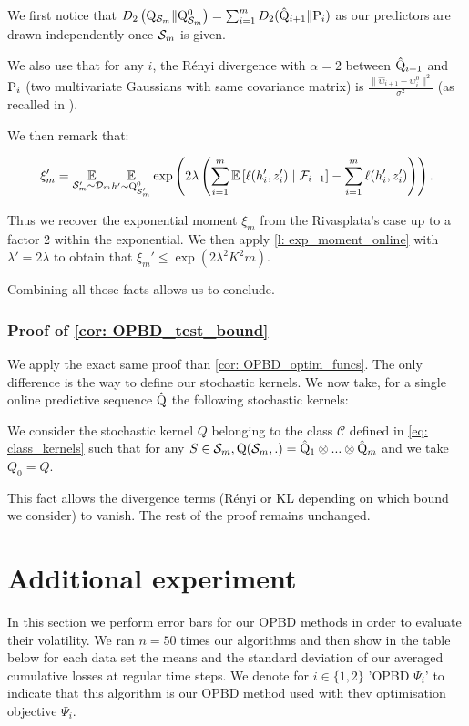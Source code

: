 We first notice that $D_{2}\left(\Q_{\Sm} \| \Q_{\Sm}^0\right) = \sum_{i=1}^m D_2(\hat{\Q}_{i+1}\| \P_{i})$ as our predictors are drawn independently once $\Sm$ is given.

We also use that for any $i$, the Rényi divergence with $\alpha=2$ between $\hat{\Q}_{i+1}$ and $\P_{i}$ (two multivariate Gaussians with same covariance matrix) is $\frac{\|\hat{w}_{i+1}- w_i^0\|^2}{\sigma^2}$ (as recalled in \cite{gil2013renyi}).

We then remark that:

\[ \xi'_m = \underset{\Sm^{\prime} \sim \Dm}{\mathbb{E}} \underset{h^{\prime} \sim \Q_{\Sm'}^0}{\mathbb{E}}
\exp\left(2\lambda \left(\sum_{i=1}^m \mathbb{E}\left[\ell(h_i',z_i')\mid \mathcal{F}_{i-1}\right]- \sum_{i=1}^m \ell(h_i',z_i') \right)\right).  \]

Thus we recover the exponential moment $\xi_m$ from the Rivasplata's case up to a factor 2 within the exponential. We then apply \cref{l: exp_moment_online} with $\lambda'= 2\lambda$ to obtain that $\xi_m'\leq \exp\left(  2\lambda^2K^2m \right)$.


Combining all those facts allows us to conclude.




\subsubsection{Proof of \cref{cor: OPBD_test_bound}}

We apply the exact same proof than \cref{cor: OPBD_optim_funcs}. The only difference is the way to define our stochastic kernels. We now take, for a single online predictive sequence $\hat{\Q}$ the following stochastic kernels:

We consider the stochastic kernel $Q$ belonging to the class $\mathcal{C}$ defined in \cref{eq: class_kernels} such that for any $S\in\Sm, \Q(\Sm,.) = \hat{\Q}_1\otimes ... \otimes \hat{\Q}_{m}$ and we take $Q_0=Q$.

This fact allows the divergence terms (Rényi or KL depending on which bound we consider) to vanish. The rest of the proof remains unchanged.


\section{Additional experiment}
\label{sec: error_bars}

In this section we perform error bars for our OPBD methods in order to evaluate their volatility.
We ran $n=50$ times our algorithms and then show in the table below for each data set the means and the standard deviation of our averaged cumulative losses at regular time steps. We denote for $i\in\{1,2\}$ 'OPBD $\Psi_i$' to indicate that this algorithm is our OPBD method used with thev optimisation objective $\Psi_i$.


